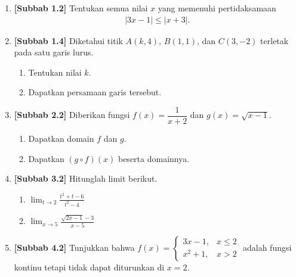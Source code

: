 \documentclass[10pt,openany,a4paper]{article}
\theoremstyle{definition}
\theoremstyle{definition}
\theoremstyle{plain}
\begin{document}
\begin{enumerate}
    \item \textbf{[Subbab 1.2]} Tentukan semua nilai $x$ yang memenuhi pertidaksamaan
    \begin{align*}
        |3x-1|\leq|x+3|.
    \end{align*}

    \item \textbf{[Subbab 1.4]} Diketahui titik $A(k,4)$, $B(1,1)$, dan $C(3,-2)$ terletak pada satu garis lurus.
    \begin{enumerate}
        \item Tentukan nilai $k$.
        \item Dapatkan persamaan garis tersebut.
    \end{enumerate}

    \item \textbf{[Subbab 2.2]} Diberikan fungsi $f(x)=\dfrac{1}{x+2}$ dan $g(x)=\sqrt{x-1}$.
    \begin{enumerate}
        \item Dapatkan domain $f$ dan $g$.
        \item Dapatkan $(g\circ f)(x)$ beserta domainnya.
    \end{enumerate}

    \item \textbf{[Subbab 3.2]} Hitunglah limit berikut.
    \begin{enumerate}
        \item $\displaystyle\lim_{t\to 2}\frac{t^2+t-6}{t^2-4}$
        \item $\displaystyle\lim_{x\to 5}\frac{\sqrt{2x-1}-3}{x-5}$
    \end{enumerate}

    \item \textbf{[Subbab 4.2]} Tunjukkan bahwa $f(x)=\begin{cases}
        3x-1, & x\leq 2\\
        x^2+1, & x>2
    \end{cases}$ adalah fungsi kontinu tetapi tidak dapat diturunkan di $x=2$.
\end{enumerate}

\newpage
\end{document}
